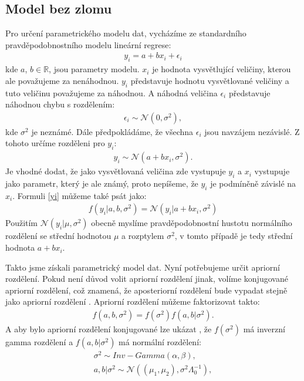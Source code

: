 \documentclass[czech,master,public,dept470,male,cpdeclaration,oneside, python]{diploma}
\begin{document}
\subsection{Model bez zlomu}

Pro určení parametrického modelu dat, vycházíme ze standardního pravděpodobnostního modelu lineární regrese: 
\begin{align}
	\label{eq:yi}
	y_i = a + b x_i + \epsilon_i
\end{align}
kde $a$, $b \in \mathbb{R}$, jsou parametry modelu. $x_i$ je hodnota vysvětlující veličiny, kterou ale považujeme za nenáhodnou. $y_i$ představuje hodnotu vysvětlované veličiny a tuto veličinu považujeme za náhodnou. A náhodná veličina $\epsilon_i$ představuje náhodnou chybu s rozdělením:
\begin{align*}
	\epsilon_i \sim \mathcal{N}(0, \sigma^2),
\end{align*}
kde $\sigma^2$ je neznámé. Dále předpokládáme, že všechna $\epsilon_i$ jsou navzájem nezávislé.
Z tohoto určíme rozděleni pro $y_i$:
\begin{align}\label{yi}
	y_i \sim \mathcal{N}(a + bx_i, \sigma^2).
\end{align}
Je vhodné dodat, že jako vysvětlovaná veličina zde vystupuje $y_i$ a $x_i$ vystupuje jako parametr, který je ale známý, proto nepíšeme, že $y_i$ je podmíněně závislé na $x_i$. Formuli \ref{yi} můžeme také psát jako:
\begin{align}
	f(y_i | a, b, \sigma^2) = \mathcal{N}(y_i | a + bx_i, \sigma^2)
\end{align}
Použitím $\mathcal{N}(y_i | \mu, \sigma^2)$ obecně myslíme pravděpodobnostní hustotu normálního rozdělení se střední hodnotou $\mu$ a rozptylem $\sigma^2$, v tomto případě je tedy střední hodnota $a + bx_i$. \par
Takto jsme získali parametrický model dat. Nyní potřebujeme určit apriorní rozdělení.
Pokud není důvod volit apriorní rozdělení jinak, volíme konjugované apriorní rozdělení, což znamená, že aposteriorní rozdělení bude vypadat stejně jako apriorní rozdělení \cite{robert2007bayesian}. Apriorní rozdělení můžeme faktorizovat takto:
\begin{align}
	f(a, b, \sigma^2) = f(\sigma^2)f(a,b | \sigma^2).
\end{align}
A aby bylo apriorní rozdělení konjugované lze ukázat \cite{sdf}, že $f(\sigma^2)$ má inverzní gamma rozdělení a $f(a,b | \sigma^2)$ má normální rozdělení:
\begin{align}
	\sigma^2 \sim Inv-Gamma(\alpha, \beta), \\
	a, b | \sigma^2 \sim \mathcal{N}((\mu_1, \mu_2), \sigma^2\Lambda_0^{-1}),
\end{align}
\end{document}
